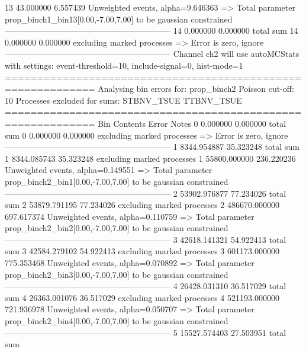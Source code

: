 13         43.000000       6.557439        Unweighted events, alpha=9.646363
  => Total parameter prop_binch1_bin13[0.00,-7.00,7.00] to be gaussian constrained
------------------------------------------------------------
14         0.000000        0.000000        total sum                     
14         0.000000        0.000000        excluding marked processes    
  => Error is zero, ignore      
------------------------------------------------------------
Channel ch2 will use autoMCStats with settings: event-threshold=10, include-signal=0, hist-mode=1
============================================================
Analysing bin errors for: prop_binch2
Poisson cut-off: 10
Processes excluded for sums: STBNV_TSUE TTBNV_TSUE
============================================================
Bin        Contents        Error           Notes                         
0          0.000000        0.000000        total sum                     
0          0.000000        0.000000        excluding marked processes    
  => Error is zero, ignore      
------------------------------------------------------------
1          8344.954887     35.323248       total sum                     
1          8344.085743     35.323248       excluding marked processes    
1          55800.000000    236.220236      Unweighted events, alpha=0.149551
  => Total parameter prop_binch2_bin1[0.00,-7.00,7.00] to be gaussian constrained
------------------------------------------------------------
2          53902.976877    77.234026       total sum                     
2          53879.791195    77.234026       excluding marked processes    
2          486670.000000   697.617374      Unweighted events, alpha=0.110759
  => Total parameter prop_binch2_bin2[0.00,-7.00,7.00] to be gaussian constrained
------------------------------------------------------------
3          42618.141321    54.922413       total sum                     
3          42584.279102    54.922413       excluding marked processes    
3          601173.000000   775.353468      Unweighted events, alpha=0.070892
  => Total parameter prop_binch2_bin3[0.00,-7.00,7.00] to be gaussian constrained
------------------------------------------------------------
4          26428.031310    36.517029       total sum                     
4          26363.001076    36.517029       excluding marked processes    
4          521193.000000   721.936978      Unweighted events, alpha=0.050707
  => Total parameter prop_binch2_bin4[0.00,-7.00,7.00] to be gaussian constrained
------------------------------------------------------------
5          15527.574403    27.503951       total sum                     
